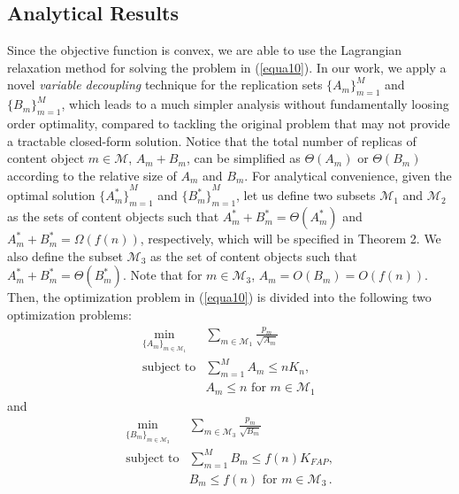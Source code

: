 \documentclass[10pt,journal,compsoc,onecolumn]{IEEEtran}
\begin{document}
\subsection{Analytical Results} \label{results}

Since the objective function is convex, we are able to use the
Lagrangian relaxation method for solving the problem in
(\ref{equa10}). In our work, we apply a novel \textit{variable
decoupling} technique for the replication sets ${\lbrace A_m
\rbrace}^M_{m=1}$ and ${\lbrace B_m \rbrace}^M_{m=1}$, which leads
to a much simpler analysis without fundamentally loosing order optimality,
compared to tackling the original problem that may not provide a
tractable closed-form solution. Notice that the total number of
replicas of content object $m \in \mathcal{M}$, $A_m+B_m$, can be
simplified as $\Theta(A_m)$ or $\Theta(B_m)$ according to the
relative size of $A_m$ and $B_m$. For analytical convenience,
given the optimal solution ${\lbrace A_m^* \rbrace}^M_{m=1}$ and
${\lbrace B_m^* \rbrace}^M_{m=1}$, let us define two subsets
$\mathcal{M}_1$ and $\mathcal{M}_2$ as the sets of content objects
such that $A_m^*+B_m^*=\Theta(A_m^*)$ and
$A_m^*+B_m^*=\Omega(f(n))$, respectively, which will be specified
in Theorem 2. We also define the subset $\mathcal{M}_3$ as the set
of content objects such that $A_m^*+B_m^*=\Theta(B_m^*)$. Note
that for $m \in \mathcal{M}_3$, $A_m=O(B_m)=O\left(f(n)\right)$.
Then, the optimization problem in (\ref{equa10}) is divided into
the following two optimization problems:
\begin{subequations}\label{equa1100}
\begin{align}
    \min_{{\lbrace{A_m\rbrace}}_{m\in \mathcal{M}_1}}
        & \sum_{m\in\mathcal{M}_1} \frac{p_m}{\sqrt{A_m}} \\
    \text{subject to}
        & \sum_{m=1}^{M} A_m \leq nK_n \label{Ac},  \\
        & A_m \leq n  \text{ for }  m \in \mathcal{M}_1 \,
\end{align}
\end{subequations}
and
\begin{subequations}\label{equa110}
\begin{align}
    \min_{{\lbrace{B_m\rbrace}}_{m\in\mathcal{M}_3}}
        & \sum_{m\in\mathcal{M}_3} \frac{p_m}{\sqrt{B_m}} \\
    \text{subject to}
        & \sum_{m=1}^M B_m \leq f(n)K_{FAP}, \label{Bc} \\
        & B_m \leq f(n)  \text{ for }  m \in \mathcal{M}_3 \,.
\end{align}
\end{subequations}
\end{document}
